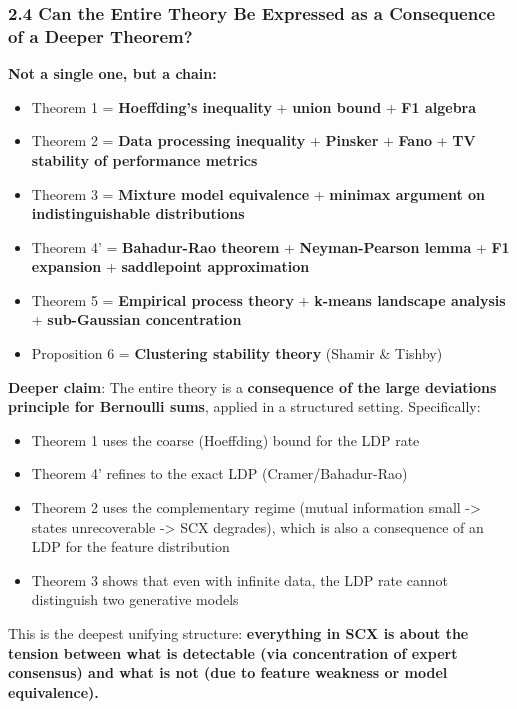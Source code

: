 \documentclass[
  12pt,
]{article}
\providecommand{\tightlist}{%
  \setlength{\itemsep}{0pt}\setlength{\parskip}{0pt}}
\begin{document}
\subsubsection{2.4 Can the Entire Theory Be Expressed as a Consequence
of a Deeper
Theorem?}\label{can-the-entire-theory-be-expressed-as-a-consequence-of-a-deeper-theorem}

\textbf{Not a single one, but a chain:}

\begin{itemize}
\tightlist
\item
  Theorem 1 = \textbf{Hoeffding's inequality} + \textbf{union bound} +
  \textbf{F1 algebra}
\item
  Theorem 2 = \textbf{Data processing inequality} + \textbf{Pinsker} +
  \textbf{Fano} + \textbf{TV stability of performance metrics}
\item
  Theorem 3 = \textbf{Mixture model equivalence} + \textbf{minimax
  argument on indistinguishable distributions}
\item
  Theorem 4' = \textbf{Bahadur-Rao theorem} + \textbf{Neyman-Pearson
  lemma} + \textbf{F1 expansion} + \textbf{saddlepoint approximation}
\item
  Theorem 5 = \textbf{Empirical process theory} + \textbf{k-means
  landscape analysis} + \textbf{sub-Gaussian concentration}
\item
  Proposition 6 = \textbf{Clustering stability theory} (Shamir \&
  Tishby)
\end{itemize}

\textbf{Deeper claim}: The entire theory is a \textbf{consequence of the
large deviations principle for Bernoulli sums}, applied in a structured
setting. Specifically:

\begin{itemize}
\tightlist
\item
  Theorem 1 uses the coarse (Hoeffding) bound for the LDP rate
\item
  Theorem 4' refines to the exact LDP (Cramer/Bahadur-Rao)
\item
  Theorem 2 uses the complementary regime (mutual information small
  -\textgreater{} states unrecoverable -\textgreater{} SCX degrades),
  which is also a consequence of an LDP for the feature distribution
\item
  Theorem 3 shows that even with infinite data, the LDP rate cannot
  distinguish two generative models
\end{itemize}

This is the deepest unifying structure: \textbf{everything in SCX is
about the tension between what is detectable (via concentration of
expert consensus) and what is not (due to feature weakness or model
equivalence).}
\end{document}

